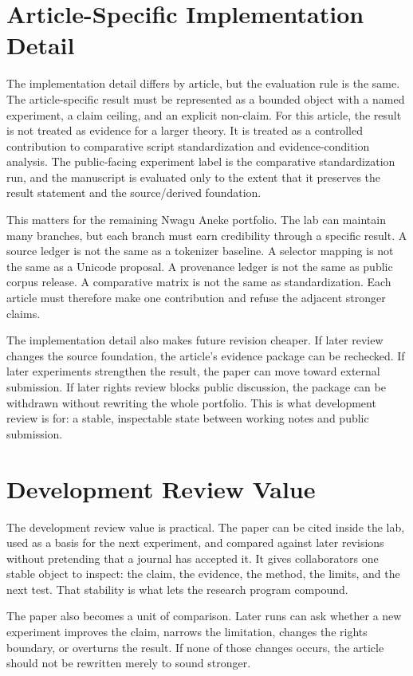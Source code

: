\documentclass[sigconf,nonacm]{acmart}
\begin{document}
\section{Article-Specific Implementation Detail}
The implementation detail differs by article, but the evaluation rule is the same.
The article-specific result must be represented as a bounded object with a named
experiment, a claim ceiling, and an explicit non-claim. For this article, the
result is not treated as evidence for a larger theory. It is treated as a
controlled contribution to comparative script standardization and evidence-condition analysis. The public-facing experiment label is the comparative standardization run, and the manuscript is evaluated only to the extent that it preserves the result
statement and the source/derived foundation.

This matters for the remaining Nwagu Aneke portfolio. The lab can maintain many
branches, but each branch must earn credibility through a specific result. A source
ledger is not the same as a tokenizer baseline. A selector mapping is not the
same as a Unicode proposal. A provenance ledger is not the same as public corpus
release. A comparative matrix is not the same as standardization. Each article
must therefore make one contribution and refuse the adjacent stronger claims.

The implementation detail also makes future revision cheaper. If later review
changes the source foundation, the article's evidence package can be rechecked. If later
experiments strengthen the result, the paper can move toward external
submission. If later rights review blocks public discussion, the package can be
withdrawn without rewriting the whole portfolio. This is what development
review is for: a stable, inspectable state between working notes and public
submission.

\section{Development Review Value}
The development review value is practical. The paper can be cited inside the lab,
used as a basis for the next experiment, and compared against later revisions
without pretending that a journal has accepted it. It gives collaborators one
stable object to inspect: the claim, the evidence, the method, the limits, and
the next test. That stability is what lets the research program compound.

The paper also becomes a unit of comparison. Later runs can ask whether a new
experiment improves the claim, narrows the limitation, changes the rights
boundary, or overturns the result. If none of those changes occurs, the article
should not be rewritten merely to sound stronger.
\end{document}
